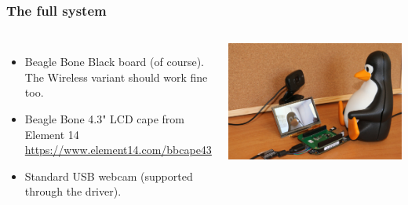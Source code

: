 \begin{frame}
  \frametitle{The full system}
  \begin{columns}
    \begin{itemize}
	\item Beagle Bone Black board (of course). The Wireless variant
	      should work fine too.
	\item Beagle Bone 4.3" LCD cape from Element 14\\
              {\small \url{https://www.element14.com/bbcape43}}
        \item Standard USB webcam (supported through the 
	      driver).
    \end{itemize}
     \includegraphics[width=\textwidth]{common/beaglecam.jpg}
  \end{columns}
\end{frame}

